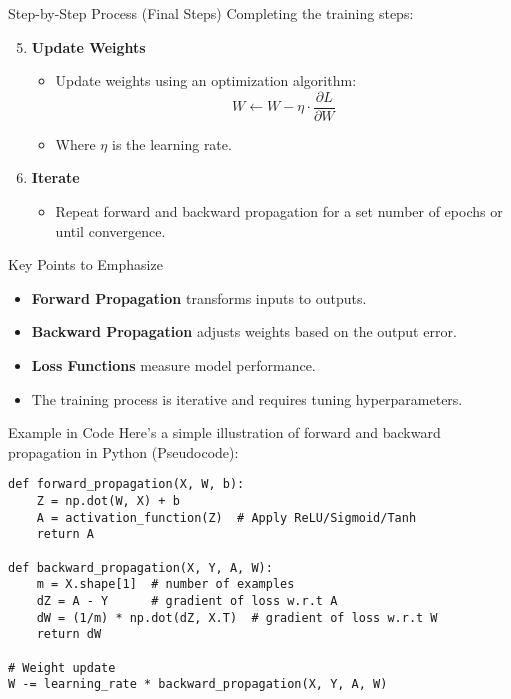 \documentclass[aspectratio=169]{beamer}
\begin{document}
\begin{frame}{Step-by-Step Process (Final Steps)}
    Completing the training steps:

    \begin{enumerate}[resume]
        \setcounter{enumi}{4}
        \item \textbf{Update Weights}
            \begin{itemize}
                \item Update weights using an optimization algorithm:
                \begin{equation}
                    W \leftarrow W - \eta \cdot \frac{\partial L}{\partial W}
                \end{equation}
                \item Where \( \eta \) is the learning rate.
            \end{itemize}

        \item \textbf{Iterate}
            \begin{itemize}
                \item Repeat forward and backward propagation for a set number of epochs or until convergence.
            \end{itemize}
    \end{enumerate}
\end{frame}

\begin{frame}[fragile]{Key Points to Emphasize}
    \begin{itemize}
        \item \textbf{Forward Propagation} transforms inputs to outputs.
        \item \textbf{Backward Propagation} adjusts weights based on the output error.
        \item \textbf{Loss Functions} measure model performance.
        \item The training process is iterative and requires tuning hyperparameters.
    \end{itemize}
\end{frame}

\begin{frame}[fragile]{Example in Code}
    Here’s a simple illustration of forward and backward propagation in Python (Pseudocode):

    \begin{lstlisting}
def forward_propagation(X, W, b):
    Z = np.dot(W, X) + b
    A = activation_function(Z)  # Apply ReLU/Sigmoid/Tanh
    return A

def backward_propagation(X, Y, A, W):
    m = X.shape[1]  # number of examples
    dZ = A - Y      # gradient of loss w.r.t A
    dW = (1/m) * np.dot(dZ, X.T)  # gradient of loss w.r.t W
    return dW

# Weight update
W -= learning_rate * backward_propagation(X, Y, A, W)
    \end{lstlisting}
\end{frame}
\end{document}
